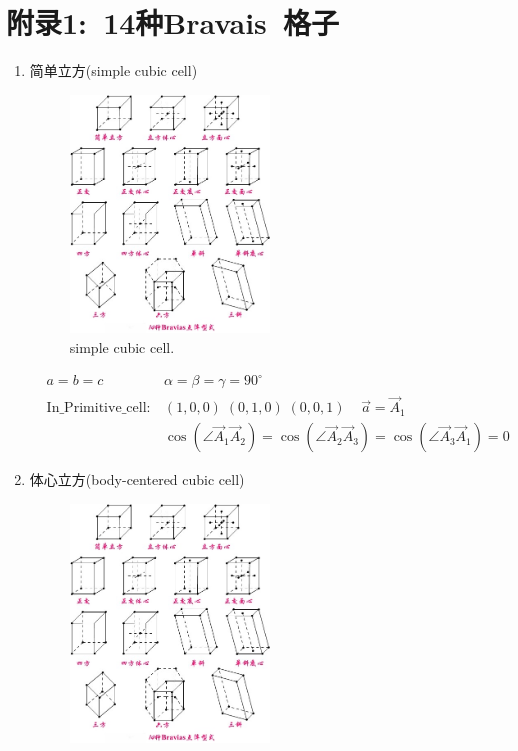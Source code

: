 \documentclass{article}      %
\begin{document}
\section{附录1:~14种\rm{Bravais~}格子}
\begin{enumerate}
		\item 简单立方(\textrm{simple cubic cell})
\begin{figure}[h!]
\centering
\includegraphics[width=0.5\textwidth,viewport=30 460 160 580,clip]{Bravias.jpg}
\caption{\small simple cubic cell.}%
\label{Bravais:Cubic}
\end{figure}
\begin{displaymath}
	\begin{aligned}
	& a=b=c &\alpha=\beta=\gamma=90^{\circ} \\
		&\mathrm{In\_Primitive\_cell}:&(1,0,0)\;(0,1,0)\;(0,0,1)\;\;\;\;\vec a=\vec A_1 \\
		& &\cos(\angle\vec A_1\vec A_2)=\cos(\angle\vec A_2\vec A_3)=\cos(\angle\vec A_3\vec A_1)=0
	\end{aligned}
\end{displaymath}
		\item 体心立方(\textrm{body-centered cubic cell})
\begin{figure}[h!]
\centering
\includegraphics[width=0.5\textwidth,viewport=170 460 290 580,clip]{Bravias.jpg}

\end{figure}
\end{enumerate}
\end{document}
